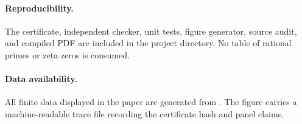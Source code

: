\paragraph{Reproducibility.}
The certificate, independent checker, unit tests, figure generator, source
audit, and compiled PDF are included in the project directory.  No table of
rational primes or zeta zeros is consumed.

\paragraph{Data availability.}
All finite data displayed in the paper are generated from
.  The figure carries a machine-readable
trace file recording the certificate hash and panel claims.
